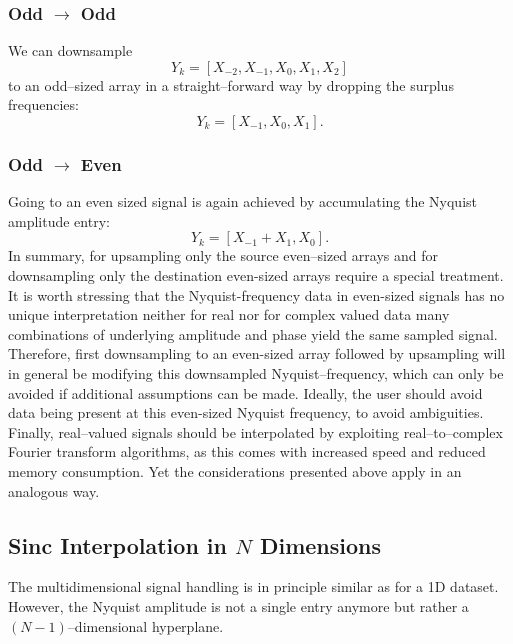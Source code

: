 \documentclass{juliacon}
\begin{document}
        \subsubsection{Odd $\rightarrow$ Odd}
            We can downsample 
            \begin{equation}
                Y_k = [X_{-2}, X_{-1}, X_0, X_1, X_2]
            \end{equation}
            to an odd--sized array in a straight--forward way by dropping the surplus frequencies:
            \begin{equation}
                Y_k = [X_{-1}, X_0, X_1].
            \end{equation}
            
       \subsubsection{Odd $\rightarrow$ Even}
           Going to an even sized signal is again achieved by accumulating the Nyquist amplitude entry:
            \begin{equation}
                Y_k = [X_{-1} + X_1, X_0].
            \end{equation}
        In summary, for upsampling only the source even--sized arrays and for downsampling only the destination even-sized arrays require a special treatment.
        It is worth stressing that the Nyquist-frequency data in even-sized signals has no unique interpretation neither for real nor for complex valued data many combinations of underlying amplitude and phase yield the same sampled signal. Therefore, first downsampling to an even-sized array followed by upsampling will in general be modifying this downsampled Nyquist--frequency, which can only be avoided if additional assumptions can be made. Ideally, the user should avoid data being present at this even-sized Nyquist frequency, to avoid ambiguities.
        Finally, real--valued signals should be interpolated by exploiting real--to--complex Fourier transform algorithms, as this comes with increased speed and reduced memory consumption. Yet the considerations presented above apply in an analogous way.
    \subsection{Sinc Interpolation in $N$ Dimensions}
        The multidimensional signal handling is in principle similar as for 
        a 1D dataset. However, the Nyquist amplitude is not a single entry anymore but rather a $(N-1)$--dimensional hyperplane.
\end{document}
